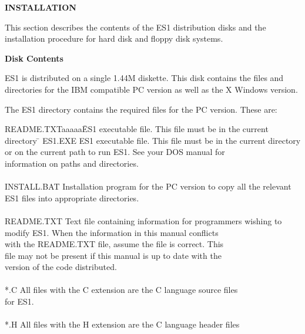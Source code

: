 \newpage
\begin{section}
{\bf INSTALLATION}

This section describes the contents of the ES1 distribution disks and the
installation procedure for hard disk and floppy disk systems.
\begin{subsection}
{\bf Disk Contents}

   ES1 is distributed on a single 1.44M diskette.  This disk contains the files
   and directories for the IBM compatible PC version as well as the X Windows
   version.
\vspace{.2in}

\noindent
   The ES1 directory contains the required files for the PC version.  These
   are:

\begin{tabbing}
        README.TXTaaaaa\= ES1 executable file.  This file must be in the current directory \=	\kill
        ES1.EXE      \> ES1 executable file.  This file must be in the current directory \>	\\
	 	     \> or on the current path to run ES1.  See your DOS manual for 	\>	\\
		     \> information on paths and directories.  					\\
												\\
        INSTALL.BAT  \> Installation program for the PC version to copy all the relevant\> 	\\
		     \> ES1 files into appropriate directories.  				\\
												\\
        README.TXT   \> Text file containing information for programmers wishing to 	\> 	\\
		     \> modify ES1.  When the information in this manual conflicts 	\>	\\
		     \> with the README.TXT file, assume the file is correct.  This 	\> 	\\
		     \> file may not be present if this manual is up to date with the 	\> 	\\
                     \> version of the code distributed.  					\\
												\\
        *.C          \> All files with the C extension are the C language source files 	\> 	\\
		     \> for ES1. 								\\
												\\
        *.H          \> All files with the H extension are the C language header files 	\>	\\

\end{tabbing}
\end{subsection}
\end{section}
